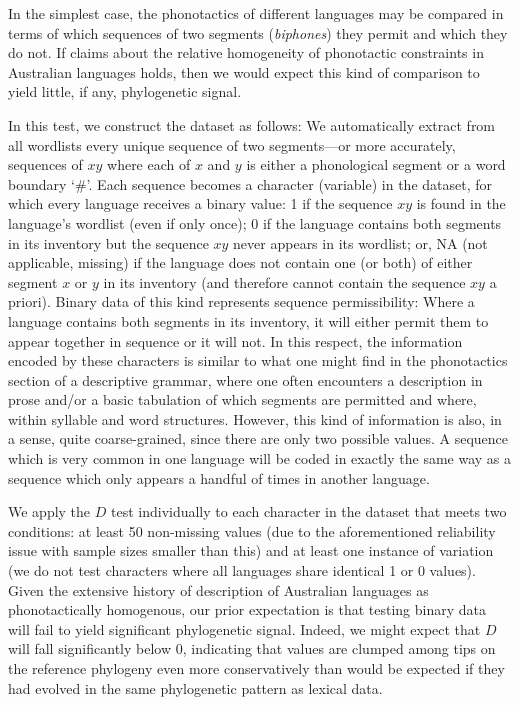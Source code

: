 In the simplest case, the phonotactics of different languages may be compared in terms of which sequences of two segments (\emph{biphones}) they permit and which they do not. If claims about the relative homogeneity of phonotactic constraints in Australian languages holds, then we would expect this kind of comparison to yield little, if any, phylogenetic signal.

In this test, we construct the dataset as follows: We automatically extract from all wordlists every unique sequence of two segments---or more accurately, sequences of \(xy\) where each of \(x\) and \(y\) is either a phonological segment or a word boundary `\#'. Each sequence becomes a character (variable) in the dataset, for which every language receives a binary value: 1 if the sequence \(xy\) is found in the language's wordlist (even if only once); 0 if the language contains both segments in its inventory but the sequence \(xy\) never appears in its wordlist; or, NA (not applicable, missing) if the language does not contain one (or both) of either segment \(x\) or \(y\) in its inventory (and therefore cannot contain the sequence \(xy\) a priori). Binary data of this kind represents sequence permissibility: Where a language contains both segments in its inventory, it will either permit them to appear together in sequence or it will not. In this respect, the information encoded by these characters is similar to what one might find in the phonotactics section of a descriptive grammar, where one often encounters a description in prose and/or a basic tabulation of which segments are permitted and where, within syllable and word structures. However, this kind of information is also, in a sense, quite coarse-grained, since there are only two possible values. A sequence which is very common in one language will be coded in exactly the same way as a sequence which only appears a handful of times in another language.

We apply the \(D\) test individually to each character in the dataset that meets two conditions: at least 50 non-missing values (due to the aforementioned reliability issue with sample sizes smaller than this) and at least one instance of variation (we do not test characters where all languages share identical 1 or 0 values). Given the extensive history of description of Australian languages as phonotactically homogenous, our prior expectation is that testing binary data will fail to yield significant phylogenetic signal. Indeed, we might expect that \(D\) will fall significantly below 0, indicating that values are clumped among tips on the reference phylogeny even more conservatively than would be expected if they had evolved in the same phylogenetic pattern as lexical data.

